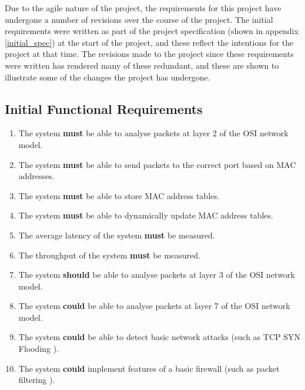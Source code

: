 
Due to the agile nature of the project, the requirements for this project have undergone a number of revisions over the course of the project.
The initial requirements were written as part of the project specification (shown in appendix \ref{initial_spec}) at the start of the project, and these reflect the intentions for the project at that time.
The revisions made to the project since these requirements were written has rendered many of these redundant, and these are shown to illustrate some of the changes the project has undergone.

\subsection{Initial Functional Requirements}
\label{initial_functional_requirements}

\begin{enumerate}[label=\textbf{F\arabic*:}]
  \item The system \textbf{must} be able to analyse packets at layer 2 of the OSI network model.
  \item The system \textbf{must} be able to send packets to the correct port based on MAC addresses.
  \item The system \textbf{must} be able to store MAC address tables.
  \item The system \textbf{must} be able to dynamically update MAC address tables.
  \item The average latency of the system \textbf{must} be measured.
  \item The throughput of the system \textbf{must} be measured.
  \item The system \textbf{should} be able to analyse packets at layer 3 of the OSI network model.
  \item The system \textbf{could} be able to analyse packets at layer 7 of the OSI network model.
  \item The system \textbf{could} be able to detect basic network attacks (such as TCP SYN Flooding \cite{rfc4987}).
  \item The system \textbf{could} implement features of a basic firewall (such as packet filtering \cite{rfc2979}).
\end{enumerate}

